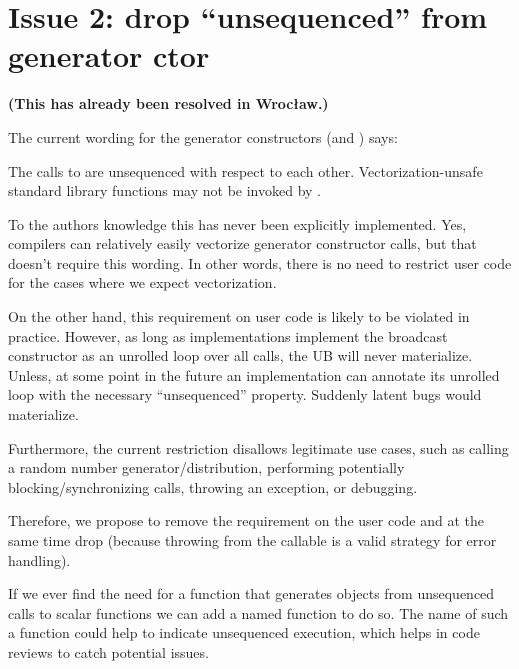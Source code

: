 \section{Issue 2: drop “unsequenced” from generator ctor}\label{sec:generatorctor}

\textbf{(This has already been resolved in Wrocław.)}

The current wording for the generator constructors (\simd and \mask) says:
\begin{wgText}
    The calls to  are unsequenced with respect to each other.
    Vectorization-unsafe standard library
    functions may not be invoked by .
\end{wgText}

To the authors knowledge this has never been explicitly implemented.
Yes, compilers can relatively easily vectorize generator constructor calls, but that doesn't require
this wording.
In other words, there is no need to restrict user code for the cases where we expect vectorization.

On the other hand, this requirement on user code is likely to be violated in practice.
However, as long as implementations implement the broadcast constructor as an unrolled loop over all
calls, the UB will never materialize.
Unless, at some point in the future an implementation can annotate its unrolled loop with the
necessary “unsequenced” property.
Suddenly latent bugs would materialize.

Furthermore, the current restriction disallows legitimate use cases, such as calling a random number
generator/distribution, performing potentially blocking/synchronizing calls, throwing an exception,
or \std{} debugging.

Therefore, we propose to remove the requirement on the user code and at the same time drop
 (because throwing from the callable is a valid strategy for error handling).

If we ever find the need for a function that generates  objects from unsequenced calls to
scalar functions we can add a named function to do so.
The name of such a function could help to indicate unsequenced execution, which helps in code
reviews to catch potential issues.

